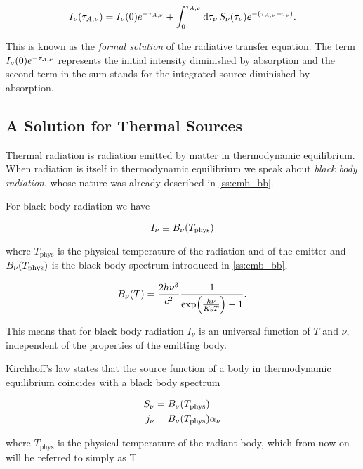 \begin{equation}
        I_\nu\qty(\tau_{A,\nu}) = I_\nu\qty(0) e^{-\tau_{A,\nu}} +
        \int^{\tau_{A,\nu}}_0 \dd{\tau_\nu}
        S_\nu\qty(\tau_\nu) e^{-\qty(\tau_{A,\nu} - \tau_\nu)}.
\end{equation}

This is known as the \emph{formal solution} of the radiative transfer
equation. The term $I_\nu\qty(0) e^{-\tau_{A,\nu}}$ represents the initial
intensity diminished by absorption and the second term in the sum stands
for the integrated source diminished by absorption.

\subsection{A Solution for Thermal Sources}

Thermal radiation is radiation emitted by matter in thermodynamic
equilibrium. When radiation is itself in thermodynamic equilibrium we
speak about \emph{black body radiation}, whose nature was already described
in \autoref{ss:cmb_bb}.

For black body radiation we have

\begin{equation}
        I_\nu \equiv B_\nu\qty(T_\text{phys})
\end{equation}

where $T_\text{phys}$ is the physical temperature of the radiation and of the
emitter and $B_\nu\qty(T_\text{phys})$ is the black body spectrum introduced
in \autoref{ss:cmb_bb},

\begin{equation}
        B_\nu\qty(T) = \frac{2h\nu^3}{c^2}
        \frac{1}{\exp(\frac{h\nu}{K_b T}) - 1}.
\end{equation}

This means that for black body radiation $I_\nu$ is an universal function
of $T$ and $\nu$, independent of the properties of the emitting body.

Kirchhoff's law states that the source function of a body in thermodynamic
equilibrium coincides with a black body spectrum

\begin{align}
        S_\nu & = B_\nu\qty(T_\text{phys}) \\
        j_\nu & = B_\nu\qty(T_\text{phys}) \alpha_\nu
\end{align}

where $T_\text{phys}$ is the physical temperature of the radiant body,
which from now on will be referred to simply as T.

